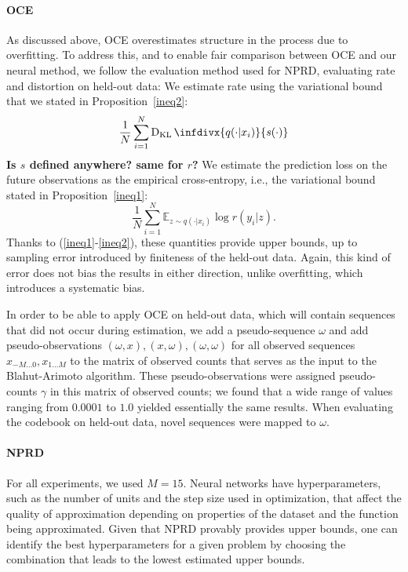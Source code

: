 \documentclass[11pt,letterpaper]{article}
\newcommand{\E}[0]{\mathbb{E}}
\begin{document}
\paragraph{OCE}
As discussed above, OCE overestimates structure in the process due to overfitting.
To address this, and to enable fair comparison between OCE and our neural method, we follow the evaluation method used for NPRD, evaluating rate and distortion on held-out data:
We estimate rate using the variational bound that we stated in Proposition~\ref{ineq2}:
\begin{equation}
\frac{1}{N} \sum_{i=1}^N \operatorname{D_{KL}}\infdivx{q(\cdot|x_i)}{s(\cdot)}
\end{equation}
\textbf{Is $s$ defined anywhere? same for $r$?}
We estimate the prediction loss on the future observations as the empirical cross-entropy, i.e., the variational bound stated in Proposition~\ref{ineq1}:
\begin{equation}
\frac{1}{N} \sum_{i=1}^N \E_{z \sim q(\cdot|x_i)} \log r(y_i|z).
\end{equation}
Thanks to (\ref{ineq1}-\ref{ineq2}), these quantities provide upper bounds, up to sampling error introduced by finiteness of the held-out data.
Again, this kind of error does not bias the results in either direction, unlike overfitting, which introduces a systematic bias.


In order to be able to apply OCE on held-out data, which will contain sequences that did not occur during estimation, we add a pseudo-sequence $\omega$ and add pseudo-observations $(\omega, x), (x, \omega), (\omega, \omega)$ for all observed sequences $x_{-M...0}, x_{1...M}$ to the matrix of observed counts that serves as the input to the Blahut-Arimoto algorithm.
These pseudo-observations were assigned pseudo-counts $\gamma$ in this matrix of observed counts; we found that a wide range of values ranging from $0.0001$ to $1.0$ yielded essentially the same results.
When evaluating the codebook on held-out data, novel sequences were mapped to $\omega$.


\paragraph{NPRD}
For all experiments, we used $M=15$.
Neural networks have hyperparameters, such as the number of units and the step size used in optimization, that affect the quality of approximation depending on properties of the dataset and the function being approximated.
Given that NPRD provably provides upper bounds, one can identify the best hyperparameters for a given problem by choosing the combination that leads to the lowest estimated upper bounds.
\end{document}
